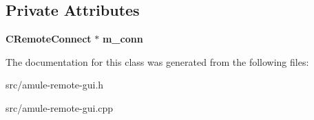 \subsection*{Private Attributes}
\begin{DoxyCompactItemize}
\item 
{\bf CRemoteConnect} $\ast$ {\bfseries m\_\-conn}\label{classCDownQueueRem_a2eb00604d38711794e9aae3c20fb5b5d}

\end{DoxyCompactItemize}


The documentation for this class was generated from the following files:\begin{DoxyCompactItemize}
\item 
src/amule-\/remote-\/gui.h\item 
src/amule-\/remote-\/gui.cpp\end{DoxyCompactItemize}
